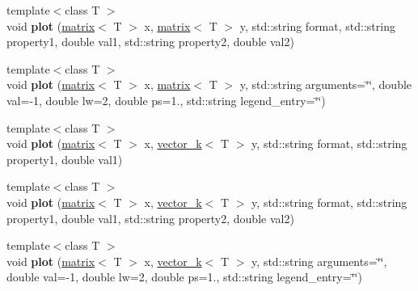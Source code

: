 \begin{DoxyCompactItemize}
\item 
\hypertarget{classkeycpp_1_1_figure_a9000f7c76f21a37d4c70bee3103fe623}{{\footnotesize template$<$class T $>$ }\\void {\bfseries plot} (\hyperlink{classkeycpp_1_1matrix}{matrix}$<$ T $>$ x, \hyperlink{classkeycpp_1_1matrix}{matrix}$<$ T $>$ y, std\-::string format, std\-::string property1, double val1, std\-::string property2, double val2)}\label{classkeycpp_1_1_figure_a9000f7c76f21a37d4c70bee3103fe623}

\item 
\hypertarget{classkeycpp_1_1_figure_a79f823ad4b62e20a85c9f1270e65fb01}{{\footnotesize template$<$class T $>$ }\\void {\bfseries plot} (\hyperlink{classkeycpp_1_1matrix}{matrix}$<$ T $>$ x, \hyperlink{classkeycpp_1_1matrix}{matrix}$<$ T $>$ y, std\-::string arguments=\char`\"{}\char`\"{}, double val=-\/1, double lw=2, double ps=1., std\-::string legend\-\_\-entry=\char`\"{}\char`\"{})}\label{classkeycpp_1_1_figure_a79f823ad4b62e20a85c9f1270e65fb01}

\item 
\hypertarget{classkeycpp_1_1_figure_a2b05fd4f96d56c354ce344b214a78cfb}{{\footnotesize template$<$class T $>$ }\\void {\bfseries plot} (\hyperlink{classkeycpp_1_1matrix}{matrix}$<$ T $>$ x, \hyperlink{classkeycpp_1_1vector__k}{vector\-\_\-k}$<$ T $>$ y, std\-::string format, std\-::string property1, double val1)}\label{classkeycpp_1_1_figure_a2b05fd4f96d56c354ce344b214a78cfb}

\item 
\hypertarget{classkeycpp_1_1_figure_a72edd078b62d033a88e8c27994fd7183}{{\footnotesize template$<$class T $>$ }\\void {\bfseries plot} (\hyperlink{classkeycpp_1_1matrix}{matrix}$<$ T $>$ x, \hyperlink{classkeycpp_1_1vector__k}{vector\-\_\-k}$<$ T $>$ y, std\-::string format, std\-::string property1, double val1, std\-::string property2, double val2)}\label{classkeycpp_1_1_figure_a72edd078b62d033a88e8c27994fd7183}

\item 
\hypertarget{classkeycpp_1_1_figure_a7d7e581c877ec95b5218d0197ac8d585}{{\footnotesize template$<$class T $>$ }\\void {\bfseries plot} (\hyperlink{classkeycpp_1_1matrix}{matrix}$<$ T $>$ x, \hyperlink{classkeycpp_1_1vector__k}{vector\-\_\-k}$<$ T $>$ y, std\-::string arguments=\char`\"{}\char`\"{}, double val=-\/1, double lw=2, double ps=1., std\-::string legend\-\_\-entry=\char`\"{}\char`\"{})}\label{classkeycpp_1_1_figure_a7d7e581c877ec95b5218d0197ac8d585}


\end{DoxyCompactItemize}

